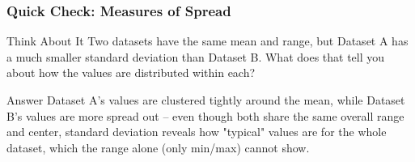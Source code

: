 \begin{frame}[fragile]\frametitle{Quick Check: Measures of Spread}
\begin{block}{Think About It}
Two datasets have the same mean and range, but Dataset A has a much smaller standard deviation than Dataset B. What does that tell you about how the values are distributed within each?
\end{block}
\pause
\begin{block}{Answer}
Dataset A's values are clustered tightly around the mean, while Dataset B's values are more spread out -- even though both share the same overall range and center, standard deviation reveals how "typical" values are for the whole dataset, which the range alone (only min/max) cannot show.
\end{block}
\end{frame}
